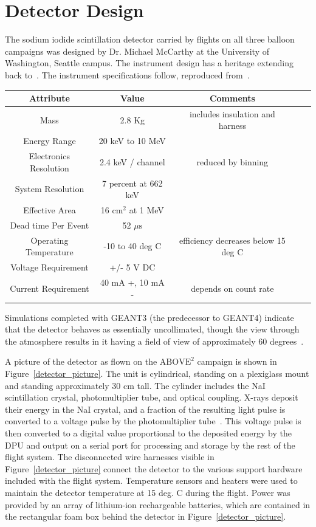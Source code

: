\section{Detector Design}

The sodium iodide scintillation detector carried by flights on all three balloon campaigns was designed by Dr. Michael McCarthy at the University of Washington, Seattle campus. The instrument design has a heritage extending back to~\citet{winckler}. The instrument specifications follow, reproduced from~\citet{Millan2014}. 

\begin{center}
\begin{tabular}{ |c|c|c|c|c| }
\hline
Attribute & Value & Comments \\
\hline
Mass & 2.8 Kg & includes insulation and harness \\
Energy Range & 20 keV to 10 MeV & \\
Electronics Resolution & 2.4 keV / channel & reduced by binning \\
System Resolution & 7 percent at 662 keV & \\
Effective Area & 16$\text{ cm}^2$ at 1 MeV & \\
Dead time Per Event & 52 $\mu\text{s}$ & \\
Operating Temperature & -10 to 40 deg C & efficiency decreases below 15 deg C \\
Voltage Requirement & +/- 5 V DC & \\
Current Requirement & 40 mA +, 10 mA - & depends on count rate\\
\hline
\end{tabular}
\end{center}

Simulations completed with GEANT3 (the predecessor to GEANT4) indicate that the detector behaves as essentially uncollimated, though the view through the atmosphere results in it having a field of view of approximately 60 degrees~\citet{Millan2014}. 

A picture of the detector as flown on the $\text{ABOVE}^2$ campaign is shown in Figure~\ref{detector_picture}. The unit is cylindrical, standing on a plexiglass mount and standing approximately 30 cm tall. The cylinder includes the NaI scintillation crystal, photomultiplier tube, and optical coupling. X-rays deposit their energy in the NaI crystal, and a fraction of the resulting light pulse is converted to a voltage pulse by the photomultiplier tube~\citet{Millan2014}. This voltage pulse is then converted to a digital value proportional to the deposited energy by the DPU and output on a serial port for processing and storage by the rest of the flight system. The disconnected wire harnesses visible in Figure~\ref{detector_picture} connect the detector to the various support hardware included with the flight system. Temperature sensors and heaters were used to maintain the detector temperature at 15 deg. C during the flight. Power was provided by an array of lithium-ion rechargeable batteries, which are contained in the rectangular foam box behind the detector in Figure~\ref{detector_picture}.

